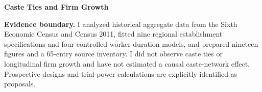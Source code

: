 \documentclass[11pt,a4paper]{report}
\begin{document}
\hypersetup{pageanchor=false}
\begin{titlepage}
\centering\vspace*{2cm}
{\Huge\bfseries Caste Ties and Firm Growth\par}
\vspace{0.5cm}{\LARGE India's Mining Industry\par}
\vspace{1cm}{\Large Public-data evidence, source inventory,\par fieldwork design and causal identification\par}
\vspace{1.5cm}{\large Detailed research report\par nakshatra0904\par 12 October 2026\par}
\vfill
\begin{minipage}{0.88\textwidth}
\textbf{Evidence boundary.} I analyzed historical aggregate data from the Sixth Economic Census and Census 2011, fitted nine regional establishment specifications and four controlled worker-duration models, and prepared nineteen figures and a 65-entry source inventory. I did not observe caste ties or longitudinal firm growth and have not estimated a causal caste-network effect. Prospective designs and trial-power calculations are explicitly identified as proposals.
\end{minipage}
\vspace{1cm}
\end{titlepage}
\hypersetup{pageanchor=true}
\end{document}

